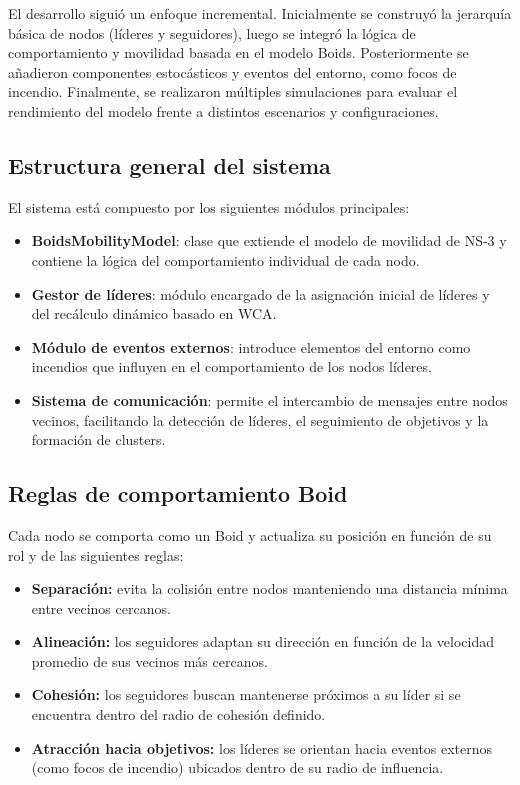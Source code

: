 \documentclass{article}
\begin{document}
El desarrollo siguió un enfoque incremental. Inicialmente se construyó la jerarquía básica de nodos (líderes y seguidores), luego se integró la lógica de comportamiento y movilidad basada en el modelo Boids. Posteriormente se añadieron componentes estocásticos y eventos del entorno, como focos de incendio. Finalmente, se realizaron múltiples simulaciones para evaluar el rendimiento del modelo frente a distintos escenarios y configuraciones.

\subsection{Estructura general del sistema}

El sistema está compuesto por los siguientes módulos principales:

\begin{itemize}
    \item \textbf{BoidsMobilityModel}: clase que extiende el modelo de movilidad de NS-3 y contiene la lógica del comportamiento individual de cada nodo.
    \item \textbf{Gestor de líderes}: módulo encargado de la asignación inicial de líderes y del recálculo dinámico basado en WCA.
    \item \textbf{Módulo de eventos externos}: introduce elementos del entorno como incendios que influyen en el comportamiento de los nodos líderes.
    \item \textbf{Sistema de comunicación}: permite el intercambio de mensajes entre nodos vecinos, facilitando la detección de líderes, el seguimiento de objetivos y la formación de clusters.
\end{itemize}

\subsection{Reglas de comportamiento Boid}

Cada nodo se comporta como un Boid y actualiza su posición en función de su rol y de las siguientes reglas:

\begin{itemize}
    \item \textbf{Separación:} evita la colisión entre nodos manteniendo una distancia mínima entre vecinos cercanos.

    \item \textbf{Alineación:} los seguidores adaptan su dirección en función de la velocidad promedio de sus vecinos más cercanos.

    \item \textbf{Cohesión:} los seguidores buscan mantenerse próximos a su líder si se encuentra dentro del radio de cohesión definido.

    \item \textbf{Atracción hacia objetivos:} los líderes se orientan hacia eventos externos (como focos de incendio) ubicados dentro de su radio de influencia.
\end{itemize}
\end{document}
